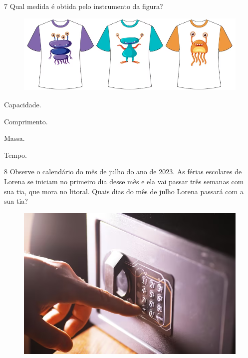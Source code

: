 \pagebreak
\num{7} Qual medida é obtida pelo instrumento da figura?

\begin{figure}[htpb!]
\centering
\includegraphics[width=.4\textwidth]{./media/image129.png}
\end{figure}

\begin{minipage}{.5\textwidth}
\begin{escolha}
\item Capacidade.

\item Comprimento.

\item Massa.

\item Tempo.
\end{escolha}
\end{minipage}


\num{8} Observe o calendário do mês de julho do ano de 2023. As férias escolares
de Lorena se iniciam no primeiro dia desse mês e ela vai passar três
semanas com sua tia, que mora no litoral. Quais dias do mês de julho
Lorena passará com a sua tia?

\begin{figure}[htpb!]
\centering
\includegraphics[width=.5\textwidth]{./media/image130.png}
\end{figure}

